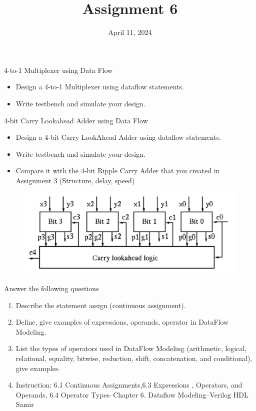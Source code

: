\documentclass{vhdl-assignment}
\title{Assignment 6}
\date{April 11, 2024}
\begin{document}
\maketitle
\thispagestyle{fancy}

\begin{problem}{4-to-1 Multiplexer using Data Flow}
    \begin{itemize}
        \item Design a 4-to-1 Multiplexer using dataflow statements.
        \item Write testbench and simulate your design.
    \end{itemize}
\end{problem}

\begin{problem}{4-bit Carry Lookahead Adder using Data Flow}
    \begin{itemize}
        \item Design a 4-bit Carry LookAhead Adder using dataflow statements.
        \item Write testbench and simulate your design.
        \item Compare it with the 4-bit Ripple Carry Adder that you created in Assignment 3 (Structure, delay, speed)
    \end{itemize}
    \begin{figure}[H]
        \centering
        \includegraphics{assets/CarryLookAheadAdder.jpg}
    \end{figure} 
\end{problem}

\begin{problem}{Answer the following questions}
    \begin{enumerate}
        \item Describe the statement assign (continuous assignment).
        \item Define, give examples of expressions, operands, operator in DataFlow Modeling.
        \item List the types of operators used in DataFlow Modeling (arithmetic, logical, relational, equality, bitwise, reduction, shift, concatenation, and conditional), give examples.
        \item Instruction: 6.1 Continuous Assignments,6.3 Expressions , Operators, and Operands, 6.4 Operator Types–Chapter 6. Dataflow Modeling–Verilog HDL Samir
    \end{enumerate}
\end{problem}
\end{document}
